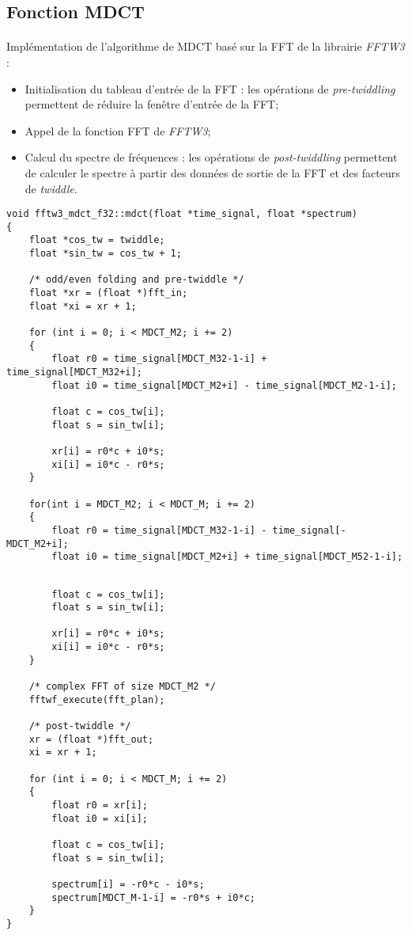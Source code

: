 \documentclass{article}
\begin{document}
\subsection{Fonction MDCT}\label{app:mdct_fftw3_f32_func}
\paragraph{}
Implémentation de l'algorithme de MDCT basé sur la FFT de la librairie \emph{FFTW3} :
\begin{itemize}
    \item Initialisation du tableau d'entrée de la FFT : les opérations de \emph{pre-twiddling} permettent de réduire la fenêtre d'entrée de la FFT;
    \item Appel de la fonction FFT de \emph{FFTW3};
    \item Calcul du spectre de fréquences : les opérations de \emph{post-twiddling} permettent de calculer le spectre à partir des données de sortie de la FFT et des facteurs de \emph{twiddle}.
\end{itemize}
\lstset{language=C++}
\begin{lstlisting}
void fftw3_mdct_f32::mdct(float *time_signal, float *spectrum)
{
    float *cos_tw = twiddle;
    float *sin_tw = cos_tw + 1;

    /* odd/even folding and pre-twiddle */
    float *xr = (float *)fft_in;
    float *xi = xr + 1;

    for (int i = 0; i < MDCT_M2; i += 2)
    {
        float r0 = time_signal[MDCT_M32-1-i] + time_signal[MDCT_M32+i];
        float i0 = time_signal[MDCT_M2+i] - time_signal[MDCT_M2-1-i];

        float c = cos_tw[i];
        float s = sin_tw[i];

        xr[i] = r0*c + i0*s;
        xi[i] = i0*c - r0*s;
    }

    for(int i = MDCT_M2; i < MDCT_M; i += 2)
    {
        float r0 = time_signal[MDCT_M32-1-i] - time_signal[-MDCT_M2+i];
        float i0 = time_signal[MDCT_M2+i] + time_signal[MDCT_M52-1-i];
\end{lstlisting}
\begin{lstlisting}

        float c = cos_tw[i];
        float s = sin_tw[i];

        xr[i] = r0*c + i0*s;
        xi[i] = i0*c - r0*s;
    }

    /* complex FFT of size MDCT_M2 */
    fftwf_execute(fft_plan);

    /* post-twiddle */
    xr = (float *)fft_out;
    xi = xr + 1;

    for (int i = 0; i < MDCT_M; i += 2)
    {
        float r0 = xr[i];
        float i0 = xi[i];

        float c = cos_tw[i];
        float s = sin_tw[i];

        spectrum[i] = -r0*c - i0*s;
        spectrum[MDCT_M-1-i] = -r0*s + i0*c;
    }
}
\end{lstlisting}
\end{document}
